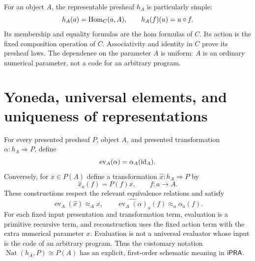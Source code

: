 For an object $A$, the representable presheaf $h_A$ is particularly simple:
\[
 h_A(a)=\operatorname{Hom}_C(a,A),\qquad h_A(f)(u)=u\circ f.
\]
Its membership and equality formulas are the hom formulas of $C$.  Its action
is the fixed composition operation of $C$.  Associativity and identity in
$C$ prove its presheaf laws.  The dependence on the parameter $A$ is uniform:
$A$ is an ordinary numerical parameter, not a code for an arbitrary program.

\section{Yoneda, universal elements, and uniqueness of representations}
\label{sec:yoneda}

\begin{theorem}
\label{thm:yoneda-pr}
For every presented presheaf $P$, object $A$, and presented transformation
$\alpha:h_A\Rightarrow P$, define
\[
 \operatorname{ev}_A(\alpha)=\alpha_A(\operatorname{id}_A).
\]
Conversely, for $x\in P(A)$ define a transformation
$\widehat{x}:h_A\Rightarrow P$ by
\begin{equation}
 \widehat{x}_a(f)=P(f)x,\qquad f:a\to A.
 \label{eq:yoneda-construction}
\end{equation}
These constructions respect the relevant equivalence relations and satisfy
\[
 \operatorname{ev}_A(\widehat{x})\approx_A x,
 \qquad
 \widehat{\operatorname{ev}_A(\alpha)}_a(f)
   \approx_a\alpha_a(f).
\]
For each fixed input presentation and transformation term, evaluation is a
primitive recursive term, and reconstruction uses the fixed action term with
the extra numerical parameter $x$.  Evaluation is not a universal evaluator
whose input is the code of an arbitrary program.  Thus the customary notation
$\operatorname{Nat}(h_A,P)\cong P(A)$ has an explicit, first-order schematic
meaning in $\mathsf{iPRA}$.
\end{theorem}
